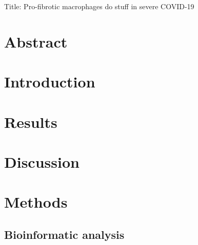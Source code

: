 \documentclass[11pt]{article}
\begin{document}
Title: Pro-fibrotic macrophages do stuff in severe COVID-19

\section*{Abstract}

\section{Introduction}

\section{Results}



\section{Discussion}

\section{Methods}

\subsection{Bioinformatic analysis}
\end{document}
